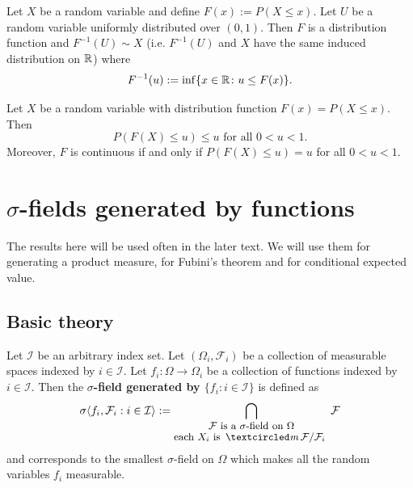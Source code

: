 \begin{theorem}[{\bf $F^{-1}(U)\sim X$}]
Let $X$ be a random variable and define $F(x):=P(X\leq x)$. Let $U$ be a random variable uniformly distributed over $(0,1)$.  Then $F$ is a distribution function and $F^{-1}(U)\sim X$ (i.e. $F^{-1}(U)$ and $X$ have the same induced distribution on $\Bbb R$) where
\begin{equation}
\label{inverse CDF definition}
F^{-1}(u):=\inf\{x\in\Bbb R\colon u\leq F(x)  \}.
\end{equation}
\end{theorem}


\begin{theorem}[{\bf  $F(X)\sim U$}]
Let $X$ be a random variable with distribution function $F(x)=P(X\leq x)$. Then
\[ P(F(X)\leq u)\leq u\text{ for all $0<u<1$.} \]
Moreover, $F$ is continuous if and only if $P(F(X)\leq u)= u$ for all $0<u<1$.
\end{theorem}




\clearpage
%
%
\section{$\sigma$-fields generated by functions}



The results here will be used often in the later text. We will use them for generating a product measure, for Fubini's theorem and for conditional expected value.



\subsection{Basic theory}


\begin{definition}
\label{def: sig generated by funs}
Let $\mathcal I$ be an arbitrary index set.
Let $(\Omega_i, \mathcal F_i)$ be a collection of measurable spaces indexed by $i\in \mathcal I$.
Let $f_i:\Omega \rightarrow \Omega_i$ be a  collection of functions indexed by $i\in \mathcal I$. Then the {\bf $\sigma$-field generated by $\{f_i: i\in\mathcal I\}$} is defined as
\[ \sigma\langle  f_i, \mathcal F_i:i\in \mathcal I \rangle :=  \bigcap_{\shortstack{\text{\small $\mathcal F$ is a $\sigma$-field on $\Omega$}  \\
 \text{\small each $X_i$ is $\mcirc \mathcal F/\mathcal F_i$ }}}\mathcal F\]
 and corresponds to the smallest $\sigma$-field  on $\Omega$ which makes all the random variables $f_i$ measurable.
 \end{definition}


